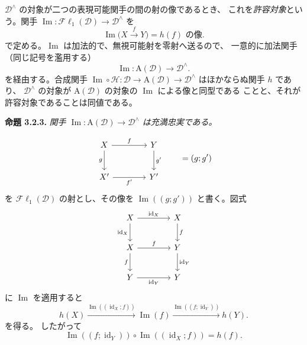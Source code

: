 \clearpage
{}%
\begingroup\small
\setlength{\parskip}{0pt}\setlength{\emergencystretch}{1.5em}

$\mathcal D^\wedge$ の対象が二つの表現可能関手の間の射の像であるとき、
これを\emph{許容対象}という。関手
$\operatorname{Im}\colon\mathcal{F}\ell_1(\mathcal D)\to\mathcal D^\wedge$
を
\[
\operatorname{Im}\bigl(X\xrightarrow fY\bigr)=h(f)\text{ の像}.
\tag{3.2.2.1}
\]
で定める。$\operatorname{Im}$ は加法的で、無視可能射を零射へ送るので、
一意的に加法関手（同じ記号を濫用する）
\[
\operatorname{Im}\colon\mathrm A(\mathcal D)\longrightarrow\mathcal D^\wedge.
\tag{3.2.2.2}
\]
を経由する。合成関手
$\operatorname{Im}\circ\mathcal H\colon
\mathcal D\longrightarrow\mathrm A(\mathcal D)
\longrightarrow\mathcal D^\wedge$
はほかならぬ関手 $h$ であり、
$\mathcal D^\wedge$ の対象が $\mathrm A(\mathcal D)$ の対象の
$\operatorname{Im}$ による像と同型である
ことと、それが許容対象であることは同値である。

\medskip\noindent\textbf{命題 3.2.3.}\quad
\textit{関手 $\operatorname{Im}\colon\mathrm A(\mathcal D)\to
\mathcal D^\wedge$ は充満忠実である。}

\[
\begin{tikzcd}[column sep=4em,row sep=2.4em]
X\arrow[r,"f"]\arrow[d,"g"']&Y\arrow[d,"g'"]\\
X'\arrow[r,"f'"']&Y'
\end{tikzcd}
\qquad=(g;g')
\]
を $\mathcal{F}\ell_1(\mathcal D)$ の射とし、その像を
$\operatorname{Im}((g;g'))$ と書く。図式
\[
\begin{tikzcd}[column sep=4em,row sep=2.2em]
X\arrow[r,"\operatorname{id}_X"]\arrow[d,"\operatorname{id}_X"']&X\arrow[d,"f"]\\
X\arrow[r,"f"]\arrow[d,"f"']&Y\arrow[d,"\operatorname{id}_Y"]\\
Y\arrow[r,"\operatorname{id}_Y"']&Y
\end{tikzcd}
\]
に $\operatorname{Im}$ を適用すると
\[
h(X)\xrightarrow{\operatorname{Im}((\operatorname{id}_X;f))}
\operatorname{Im}(f)\xrightarrow{\operatorname{Im}((f;\operatorname{id}_Y))}h(Y).
\]
を得る。
したがって
\[
\operatorname{Im}((f;\operatorname{id}_Y))\circ
\operatorname{Im}((\operatorname{id}_X;f))=h(f).
\tag{3.2.3.1}
\]
\endgroup
